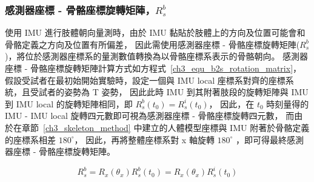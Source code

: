 \subsubsection{感測器座標 - 骨骼座標旋轉矩陣，$R^b_s$}
使用 IMU 進行肢體朝向量測時，由於 IMU 黏貼於肢體上的方向及位置可能會和骨骼定義之方向及位置有所偏差，
因此需使用感測器座標 - 骨骼座標旋轉矩陣($R^b_s$)，將位於感測器座標系的量測數值轉換為以骨骼座標系表示的骨骼朝向。
感測器座標 - 骨骼座標旋轉矩陣計算方式如方程式~\ref{ch3_equ_b2s_rotation_matrix}，
假設受試者在最初始開始實驗時，設定一個與 IMU local 座標系對齊的座標系統，且受試者的姿勢為 T 姿勢，
因此此時 IMU 到其附著肢段的旋轉矩陣與 IMU 到 IMU local 的旋轉矩陣相同，即 $R^{b}_{s}(t_0) = R^{i}_{s}(t_0)$，
因此，在 $t_0$ 時刻量得的 IMU - IMU local 旋轉四元數即可視為感測器座標 - 骨骼座標旋轉四元數，
而由於在章節~\ref{ch3_skeleton_method} 中建立的人體模型座標與 IMU 附著於骨骼定義的座標系相差 $180^{\circ}$，
因此，再將整體座標系對 x 軸旋轉 $180^{\circ}$ ，即可得最終感測器座標 - 骨骼座標旋轉矩陣。 

\begin{equation}
   R^{b}_{s} = R_{x}(\theta_{x})R^{b}_{s}(t_0) = R_{x}(\theta_{x})R^{i}_{s}(t_0)
   \label{ch3_equ_b2s_rotation_matrix}
\end{equation}


